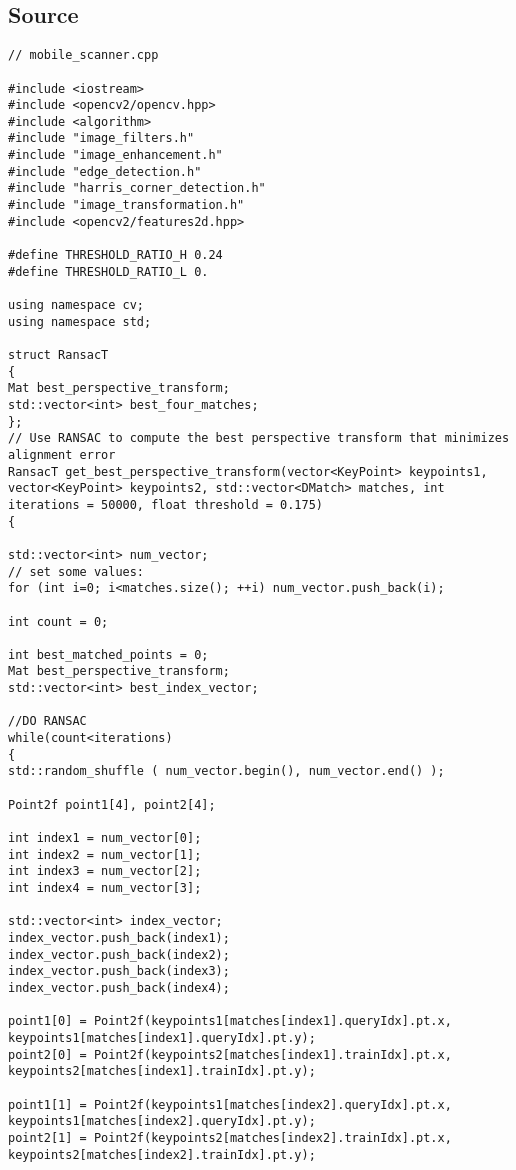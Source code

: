 \subsection{Source}
\begin{lstlisting}
// mobile_scanner.cpp

#include <iostream>
#include <opencv2/opencv.hpp>
#include <algorithm>  
#include "image_filters.h"
#include "image_enhancement.h"
#include "edge_detection.h"
#include "harris_corner_detection.h"
#include "image_transformation.h"
#include <opencv2/features2d.hpp> 

#define THRESHOLD_RATIO_H 0.24
#define THRESHOLD_RATIO_L 0.

using namespace cv;
using namespace std;

struct RansacT
{
Mat best_perspective_transform;
std::vector<int> best_four_matches;
};
// Use RANSAC to compute the best perspective transform that minimizes alignment error
RansacT get_best_perspective_transform(vector<KeyPoint> keypoints1, vector<KeyPoint> keypoints2, std::vector<DMatch> matches, int iterations = 50000, float threshold = 0.175)
{

std::vector<int> num_vector;
// set some values:
for (int i=0; i<matches.size(); ++i) num_vector.push_back(i); 

int count = 0;

int best_matched_points = 0;
Mat best_perspective_transform;
std::vector<int> best_index_vector;

//DO RANSAC
while(count<iterations)
{
std::random_shuffle ( num_vector.begin(), num_vector.end() );

Point2f point1[4], point2[4];

int index1 = num_vector[0];
int index2 = num_vector[1];
int index3 = num_vector[2];
int index4 = num_vector[3];

std::vector<int> index_vector;
index_vector.push_back(index1);
index_vector.push_back(index2);
index_vector.push_back(index3);
index_vector.push_back(index4);

point1[0] = Point2f(keypoints1[matches[index1].queryIdx].pt.x, keypoints1[matches[index1].queryIdx].pt.y);
point2[0] = Point2f(keypoints2[matches[index1].trainIdx].pt.x, keypoints2[matches[index1].trainIdx].pt.y);

point1[1] = Point2f(keypoints1[matches[index2].queryIdx].pt.x, keypoints1[matches[index2].queryIdx].pt.y);
point2[1] = Point2f(keypoints2[matches[index2].trainIdx].pt.x, keypoints2[matches[index2].trainIdx].pt.y);


\end{lstlisting}
